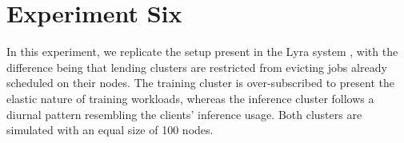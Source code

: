\section{Experiment Six}
\vspace{2em}
\begin{center}
\end{center}

In this experiment, we replicate the setup present in the Lyra system
\cite{li_lyra_2023}, with the difference being that lending clusters are
restricted from evicting jobs already scheduled on their nodes. The training
cluster is over-subscribed to present the elastic nature of training workloads,
whereas the inference cluster follows a diurnal pattern resembling the clients'
inference usage. Both clusters are simulated with an equal size of 100 nodes.  


